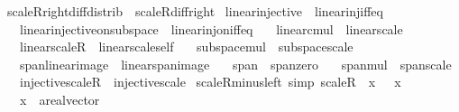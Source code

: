 \begin{isabellebody}
\isamarkupfalse%
\ scaleR{\isacharunderscore}{\kern0pt}right{\isacharunderscore}{\kern0pt}diff{\isacharunderscore}{\kern0pt}distrib\ {\isacharequal}{\kern0pt}\ scaleR{\isacharunderscore}{\kern0pt}diff{\isacharunderscore}{\kern0pt}right\isanewline
\isanewline
{}\isamarkupfalse%
\ linear{\isacharunderscore}{\kern0pt}injective{\isacharunderscore}{\kern0pt}{}\ {\isacharequal}{\kern0pt}\ linear{\isacharunderscore}{\kern0pt}inj{\isacharunderscore}{\kern0pt}iff{\isacharunderscore}{\kern0pt}eq{\isacharunderscore}{\kern0pt}{}\isanewline
\ \ \ linear{\isacharunderscore}{\kern0pt}injective{\isacharunderscore}{\kern0pt}on{\isacharunderscore}{\kern0pt}subspace{\isacharunderscore}{\kern0pt}{}\ {\isacharequal}{\kern0pt}\ linear{\isacharunderscore}{\kern0pt}inj{\isacharunderscore}{\kern0pt}on{\isacharunderscore}{\kern0pt}iff{\isacharunderscore}{\kern0pt}eq{\isacharunderscore}{\kern0pt}{}\isanewline
\ \ \ linear{\isacharunderscore}{\kern0pt}cmul\ {\isacharequal}{\kern0pt}\ linear{\isacharunderscore}{\kern0pt}scale\isanewline
\ \ \ linear{\isacharunderscore}{\kern0pt}scaleR\ {\isacharequal}{\kern0pt}\ linear{\isacharunderscore}{\kern0pt}scale{\isacharunderscore}{\kern0pt}self\isanewline
\ \ \ subspace{\isacharunderscore}{\kern0pt}mul\ {\isacharequal}{\kern0pt}\ subspace{\isacharunderscore}{\kern0pt}scale\isanewline
\ \ \ span{\isacharunderscore}{\kern0pt}linear{\isacharunderscore}{\kern0pt}image\ {\isacharequal}{\kern0pt}\ linear{\isacharunderscore}{\kern0pt}span{\isacharunderscore}{\kern0pt}image\isanewline
\ \ \ span{\isacharunderscore}{\kern0pt}{}\ {\isacharequal}{\kern0pt}\ span{\isacharunderscore}{\kern0pt}zero\isanewline
\ \ \ span{\isacharunderscore}{\kern0pt}mul\ {\isacharequal}{\kern0pt}\ span{\isacharunderscore}{\kern0pt}scale\isanewline
\ \ \ injective{\isacharunderscore}{\kern0pt}scaleR\ {\isacharequal}{\kern0pt}\ injective{\isacharunderscore}{\kern0pt}scale\isanewline
\isanewline
{}\isamarkupfalse%
\ scaleR{\isacharunderscore}{\kern0pt}minus{}{\isacharunderscore}{\kern0pt}left\ {\isacharbrackleft}{\kern0pt}simp{\isacharbrackright}{\kern0pt}{\isacharcolon}{\kern0pt}\ {\isachardoublequoteopen}scaleR\ {\isacharparenleft}{\kern0pt}{\isacharminus}{\kern0pt}{}{\isacharparenright}{\kern0pt}\ x\ {\isacharequal}{\kern0pt}\ {\isacharminus}{\kern0pt}\ x{\isachardoublequoteclose}\isanewline
\ \ \ x\ {\isacharcolon}{\kern0pt}{\isacharcolon}{\kern0pt}\ {\isachardoublequoteopen}{\isacharprime}{\kern0pt}a{\isacharcolon}{\kern0pt}{\isacharcolon}{\kern0pt}real{\isacharunderscore}{\kern0pt}vector{\isachardoublequoteclose}\isanewline

\end{isabellebody}
